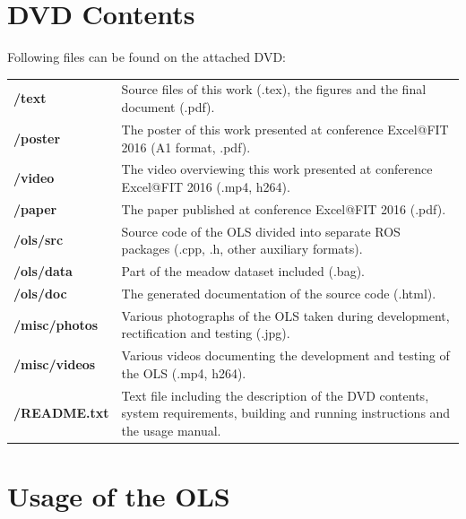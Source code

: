 \chapter{DVD Contents}

Following files can be found on the attached DVD:

{\renewcommand{\arraystretch}{1.2}
\begin{table}[htbp]
	\centering
	\begin{tabularx}{1.0\textwidth}{lX}
		\textbf{/text} & Source files of this work (.tex), the figures and the final document (.pdf). \\
		\textbf{/poster} & The poster of this work presented at conference Excel@FIT 2016 (A1 format, .pdf). \\
		\textbf{/video} & The video  overviewing this work presented at conference Excel@FIT 2016 (.mp4, h264). \\
		\textbf{/paper} & The paper published at conference Excel@FIT 2016 (.pdf). \\
		\textbf{/ols/src} & Source code of the OLS divided into separate ROS packages (.cpp, .h, other auxiliary formats). \\
		\textbf{/ols/data} & Part of the meadow dataset included (.bag). \\
		\textbf{/ols/doc} & The generated documentation of the source code (.html). \\
		\textbf{/misc/photos} & Various photographs of the OLS taken during development, rectification and testing (.jpg). \\
		\textbf{/misc/videos} & Various videos documenting the development and testing of the OLS (.mp4, h264). \\
		\textbf{/README.txt} & Text file including the description of the DVD contents, system requirements, building and running instructions and the usage manual. \\
	\end{tabularx}
	\label{tab:dvd_contents}
\end{table}%
}

\chapter{Usage of the OLS}

